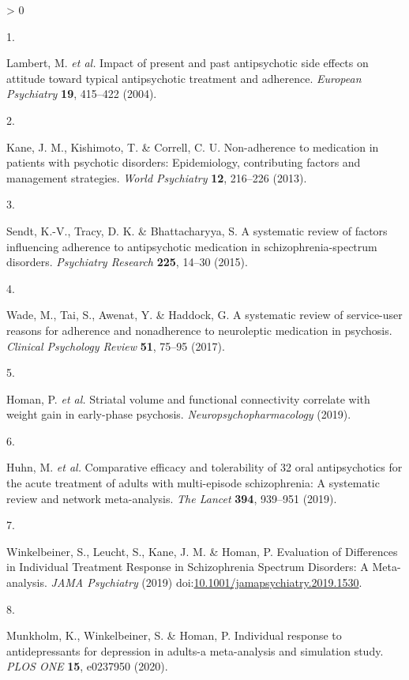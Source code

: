 \documentclass[
  9pt,
  english,
  ,jou,floatsintext]{apa6}
\newlength{\cslhangindent}
\newlength{\csllabelwidth}
\newenvironment{CSLReferences}[2] %
 {%
  \setlength{\parindent}{0pt}
  \ifodd #1 \everypar{\setlength{\hangindent}{\cslhangindent}}\ignorespaces\fi
  \ifnum #2 > 0
  \setlength{\parskip}{#2\baselineskip}
  \fi
 }%
 {}
\newcommand{\CSLLeftMargin}[1]{\parbox[t]{\csllabelwidth}{#1}}
\newcommand{\CSLRightInline}[1]{\parbox[t]{\linewidth - \csllabelwidth}{#1}\break}
\begin{document}
\hypertarget{refs}{}
\begin{CSLReferences}{0}{0}
\leavevmode\hypertarget{ref-Lambert2004}{}%
\CSLLeftMargin{1. }
\CSLRightInline{Lambert, M. \emph{et al.} Impact of present and past antipsychotic side effects on attitude toward typical antipsychotic treatment and adherence. \emph{European Psychiatry} \textbf{19}, 415--422 (2004).}

\leavevmode\hypertarget{ref-Kane2013}{}%
\CSLLeftMargin{2. }
\CSLRightInline{Kane, J. M., Kishimoto, T. \& Correll, C. U. Non-adherence to medication in patients with psychotic disorders: Epidemiology, contributing factors and management strategies. \emph{{World Psychiatry}} \textbf{12}, 216--226 (2013).}

\leavevmode\hypertarget{ref-Sendt2015}{}%
\CSLLeftMargin{3. }
\CSLRightInline{Sendt, K.-V., Tracy, D. K. \& Bhattacharyya, S. A systematic review of factors influencing adherence to antipsychotic medication in schizophrenia-spectrum disorders. \emph{Psychiatry Research} \textbf{225}, 14--30 (2015).}

\leavevmode\hypertarget{ref-Wade2017}{}%
\CSLLeftMargin{4. }
\CSLRightInline{Wade, M., Tai, S., Awenat, Y. \& Haddock, G. A systematic review of service-user reasons for adherence and nonadherence to neuroleptic medication in psychosis. \emph{Clinical Psychology Review} \textbf{51}, 75--95 (2017).}

\leavevmode\hypertarget{ref-Homan2019k}{}%
\CSLLeftMargin{5. }
\CSLRightInline{Homan, P. \emph{et al.} Striatal volume and functional connectivity correlate with weight gain in early-phase psychosis. \emph{Neuropsychopharmacology} (2019).}

\leavevmode\hypertarget{ref-Huhn2019}{}%
\CSLLeftMargin{6. }
\CSLRightInline{Huhn, M. \emph{et al.} Comparative efficacy and tolerability of 32 oral antipsychotics for the acute treatment of adults with multi-episode schizophrenia: A systematic review and network meta-analysis. \emph{The Lancet} \textbf{394}, 939--951 (2019).}

\leavevmode\hypertarget{ref-Winkelbeiner2019}{}%
\CSLLeftMargin{7. }
\CSLRightInline{Winkelbeiner, S., Leucht, S., Kane, J. M. \& Homan, P. Evaluation of {Differences} in {Individual} {Treatment} {Response} in {Schizophrenia} {Spectrum} {Disorders}: {A} {Meta}-analysis. \emph{JAMA Psychiatry} (2019) doi:\href{https://doi.org/10.1001/jamapsychiatry.2019.1530}{10.1001/jamapsychiatry.2019.1530}.}

\leavevmode\hypertarget{ref-Munkholm2020}{}%
\CSLLeftMargin{8. }
\CSLRightInline{Munkholm, K., Winkelbeiner, S. \& Homan, P. Individual response to antidepressants for depression in adults-a meta-analysis and simulation study. \emph{PLOS ONE} \textbf{15}, e0237950 (2020).}


\end{CSLReferences}
\end{document}
